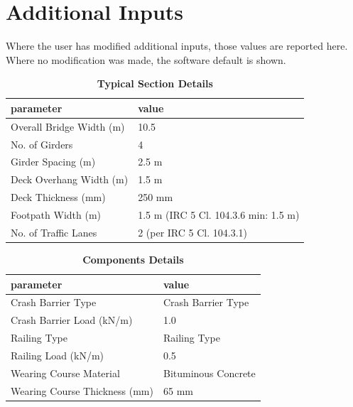 \documentclass[12pt,a4paper]{report}
\numberwithin{table}{chapter}
\numberwithin{figure}{chapter}
\begin{document}
\newpage
\section{Additional Inputs}
\label{sec:additional-inputs}

Where the user has modified additional inputs, those values are reported here. Where no modification was made, the software default is shown.

\vspace{0.8cm}

\begin{longtable}{|L{5.5cm}|p{10.0cm}|}
\caption{\textbf{Typical Section Details}}
\hline
\textbf{parameter} & \textbf{value} \\
\hline
\textnormal{Overall Bridge Width (m)} & 10.5 \\[6pt]
\hline
\textnormal{No. of Girders} & 4 \\[6pt]
\hline
\textnormal{Girder Spacing (m)} & 2.5 m \\[6pt]
\hline
\textnormal{Deck Overhang Width (m)} & 1.5 m \\[6pt]
\hline
\textnormal{Deck Thickness (mm)} & 250 mm \\[6pt]
\hline
\textnormal{Footpath Width (m)} & 1.5 m (IRC 5 Cl. 104.3.6 min: 1.5 m) \\[6pt]
\hline
\textnormal{No. of Traffic Lanes} & 2 (per IRC 5 Cl. 104.3.1) \\[6pt]
\hline
\end{longtable}

\vspace{0.8em}

\begin{longtable}{|L{5.5cm}|p{10.0cm}|}
\caption{\textbf{Components Details}}
\hline
\textbf{parameter} & \textbf{value} \\
\hline
\textnormal{Crash Barrier Type} & Crash Barrier Type \\[6pt]
\hline
\textnormal{Crash Barrier Load (kN/m)} & 1.0 \\[6pt]
\hline

\textnormal{Railing Type} & Railing Type \\[6pt]
\hline
\textnormal{Railing Load (kN/m)} & 0.5 \\[6pt]
\hline
\textnormal{Wearing Course Material} & Bituminous Concrete \\[6pt]
\hline
\textnormal{Wearing Course Thickness (mm)} & 65 mm \\[6pt]
\hline
\end{longtable}
\end{document}
